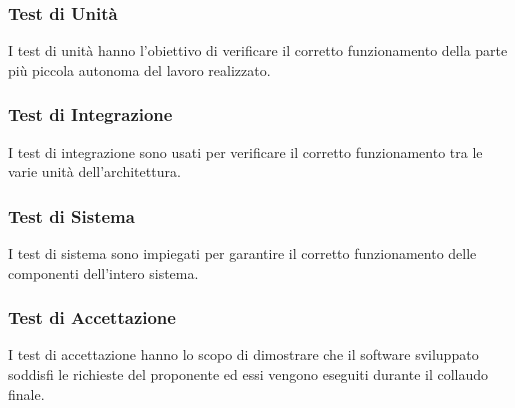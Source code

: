 \subsubsection{Test di Unità}
I test di unità hanno l'obiettivo di verificare il corretto funzionamento della 
parte più piccola autonoma del lavoro realizzato. 

\subsubsection{Test di Integrazione}
I test di integrazione sono usati per verificare il corretto funzionamento tra le
varie unità dell'architettura.

\subsubsection{Test di Sistema}
I test di sistema sono impiegati per garantire il corretto funzionamento delle 
componenti dell'intero sistema.

\subsubsection{Test di Accettazione}
I test di accettazione hanno lo scopo di dimostrare che il software sviluppato 
soddisfi le richieste del proponente ed essi vengono eseguiti durante il
collaudo finale.